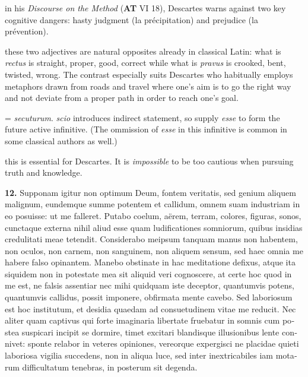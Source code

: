  in his \textit{Discourse on the Method} (\textbf{AT} VI 18), Descartes warns against two key cognitive dangers: hasty judgment (la précipitation) and prejudice (la prévention).

 these two adjectives are natural opposites already in classical Latin: what is \textit{rectus} is straight, proper, good, correct while what is \textit{pravus} is crooked, bent, twisted, wrong. The contrast especially suits Descartes who habitually employs metaphors drawn from roads and travel where one's aim is to go the right way and not deviate from a proper path in order to reach one's goal.

 = \textit{secuturum}. \textit{scio} introduces indirect statement, so supply \textit{esse} to form the future active infinitive. (The ommission of \textit{esse} in this infinitive is common in some classical authors as well.)

 this is essential for Descartes. It is \textit{impossible} to be too cautious when pursuing truth and knowledge.

\clearpage

\beginnumbering
\pstart
\begin{latin}
    \textenglish{\textbf{12.}} Supponam igitur non optimum Deum, fontem veritatis, sed genium aliquem malignum, eundemque summe potentem et callidum, omnem suam industriam in eo posuisse: ut me falleret. Putabo coelum, aërem, terram, colores, figuras, sonos, cunctaque externa nihil aliud esse quam ludificationes somniorum, quibus insidias credulitati meae tetendit. Considerabo meipsum tanquam manus non habentem, non oculos, non carnem, non sanguinem, non aliquem sensum, sed haec omnia me habere falso opinantem. Manebo obstinate in hac meditatione defixus, atque ita siquidem non in potestate mea sit aliquid veri cognoscere, at certe hoc quod in me est, ne falsis assentiar nec mihi quidquam iste deceptor, quantumvis potens, quantumvis callidus, possit imponere, obfirmata mente cavebo. Sed laboriosum est hoc institutum, et desidia quaedam ad consuetudinem vitae me reducit. Nec aliter quam captivus qui forte imaginaria libertate fruebatur in somnis cum postea suspicari incipit se dormire, timet excitari blandisque illusionibus lente connivet:  sponte relabor in veteres opiniones, vereorque expergisci ne placidae quieti laboriosa vigilia succedens, non in aliqua luce, sed inter inextricabiles iam motarum difficultatum tenebras, in posterum sit degenda.
\end{latin}
\pend
\endnumbering

